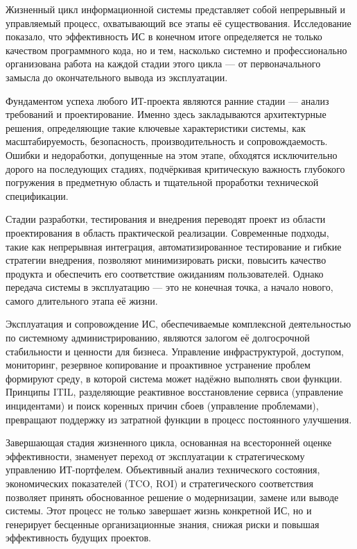 \documentclass{SibFU-docs}
\begin{document}
Жизненный цикл информационной системы представляет собой непрерывный и управляемый процесс, охватывающий все этапы её существования. Исследование показало, что эффективность ИС в конечном итоге определяется не только качеством программного кода, но и тем, насколько системно и профессионально организована работа на каждой стадии этого цикла — от первоначального замысла до окончательного вывода из эксплуатации.

Фундаментом успеха любого ИТ-проекта являются ранние стадии — анализ требований и проектирование. Именно здесь закладываются архитектурные решения, определяющие такие ключевые характеристики системы, как масштабируемость, безопасность, производительность и сопровождаемость. Ошибки и недоработки, допущенные на этом этапе, обходятся исключительно дорого на последующих стадиях, подчёркивая критическую важность глубокого погружения в предметную область и тщательной проработки технической спецификации.

Стадии разработки, тестирования и внедрения переводят проект из области проектирования в область практической реализации. Современные подходы, такие как непрерывная интеграция, автоматизированное тестирование и гибкие стратегии внедрения, позволяют минимизировать риски, повысить качество продукта и обеспечить его соответствие ожиданиям пользователей. Однако передача системы в эксплуатацию — это не конечная точка, а начало нового, самого длительного этапа её жизни.

Эксплуатация и сопровождение ИС, обеспечиваемые комплексной деятельностью по системному администрированию, являются залогом её долгосрочной стабильности и ценности для бизнеса. Управление инфраструктурой, доступом, мониторинг, резервное копирование и проактивное устранение проблем формируют среду, в которой система может надёжно выполнять свои функции. Принципы ITIL, разделяющие реактивное восстановление сервиса (управление инцидентами) и поиск коренных причин сбоев (управление проблемами), превращают поддержку из затратной функции в процесс постоянного улучшения.

Завершающая стадия жизненного цикла, основанная на всесторонней оценке эффективности, знаменует переход от эксплуатации к стратегическому управлению ИТ-портфелем. Объективный анализ технического состояния, экономических показателей (TCO, ROI) и стратегического соответствия позволяет принять обоснованное решение о модернизации, замене или выводе системы. Этот процесс не только завершает жизнь конкретной ИС, но и генерирует бесценные организационные знания, снижая риски и повышая эффективность будущих проектов.
\end{document}

